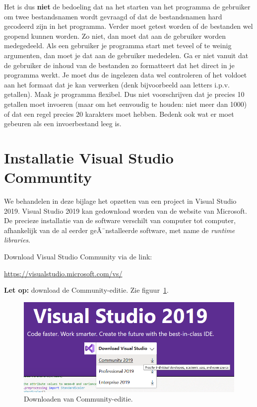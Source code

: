 \documentclass[a4paper,10pt,fleqn,twoside]{article}
\begin{document}
Het is dus \textbf{niet} de bedoeling dat na het starten van het programma de gebruiker om twee bestandsnamen wordt gevraagd of dat de bestandsnamen hard gecodeerd zijn in het programma. Verder moet getest worden of de bestanden wel geopend kunnen worden. Zo niet, dan moet dat aan de gebruiker worden medegedeeld. Als een gebruiker je programma start met teveel of te weinig argumenten, dan moet je dat aan de gebruiker mededelen. Ga er niet vanuit dat de gebruiker de inhoud van de bestanden zo formatteert dat het direct in je programma werkt. Je moet dus de ingelezen data wel controleren of het voldoet aan het formaat dat je kan verwerken (denk bijvoorbeeld aan letters i.p.v. getallen). Maak je programma flexibel. Dus niet voorschrijven dat je precies 10 getallen moet invoeren (maar om het eenvoudig te houden: niet meer dan 1000) of dat een regel precies 20 karakters moet hebben. Bedenk ook wat er moet gebeuren als een invoerbestand leeg is.



\appendix

\section{Installatie Visual Studio Communtity}
\label{sec:installatievsc}
We behandelen in deze bijlage het opzetten van een project in Visual Studio 2019. Visual Studio 2019 kan gedownload worden van de website van Microsoft. De precieze installatie van de software verschilt van computer tot computer, afhankelijk van de al eerder geÃ¯nstalleerde software, met name de \textsl{runtime libraries}.

Download Visual Studio Community via de link:

\hspace*{1em}\url{https://visualstudio.microsoft.com/vs/}

\textbf{Let op:} download de Community-editie. Zie figuur~\ref{fig:000Adownloadcommunity}.

\begin{figure}[H]
\centering
\includegraphics[scale=0.3]{000Adownloadcommunity}
\caption{Downloaden van Community-editie.}
\label{fig:000Adownloadcommunity}
\end{figure}
\end{document}
